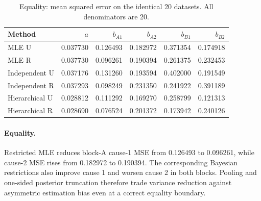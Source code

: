 \begin{table}[htbp]\centering\small

\caption{Equality: mean squared error on the identical 20 datasets. All denominators are 20.}

\begin{tabular}{lrrrrr}\hline Method & $a$ & $b_{A1}$ & $b_{A2}$ & $b_{B1}$ & $b_{B2}$\\\hline

MLE U & 0.037730 & 0.126493 & 0.182972 & 0.371354 & 0.174918\\

MLE R & 0.037730 & 0.096261 & 0.190394 & 0.261375 & 0.232453\\

Independent U & 0.037176 & 0.131260 & 0.193594 & 0.402000 & 0.191549\\

Independent R & 0.037293 & 0.098249 & 0.231350 & 0.241922 & 0.391189\\

Hierarchical U & 0.028812 & 0.111292 & 0.169270 & 0.258799 & 0.121313\\

Hierarchical R & 0.028690 & 0.076524 & 0.201372 & 0.173942 & 0.240126\\

\hline\end{tabular}\end{table}

\paragraph{Equality.} Restricted MLE reduces block-A cause-1 MSE from 0.126493 to 0.096261, while cause-2 MSE rises from 0.182972 to 0.190394. The corresponding Bayesian restrictions also improve cause 1 and worsen cause 2 in both blocks. Pooling and one-sided posterior truncation therefore trade variance reduction against asymmetric estimation bias even at a correct equality boundary.

